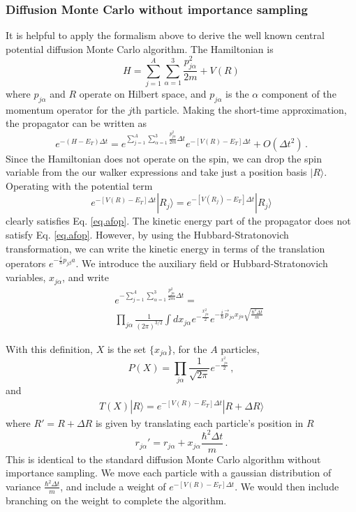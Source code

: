  \subsubsection{Diffusion Monte Carlo without importance sampling}
 It is helpful to apply the formalism above to derive
 the well known central potential
 diffusion Monte Carlo algorithm\cite{Anderson76}.
 The Hamiltonian is
 \begin{equation}
 H = \sum_{j=1}^A \sum_{\alpha=1}^3 \frac{p_{j\alpha}^2}{2m} + V(R)
 \end{equation}
 where $p_{j\alpha}$ and $R$ operate on Hilbert space, and $p_{j\alpha}$
 is the $\alpha$ component of the momentum operator for the $j$th
 particle.
 Making the short-time approximation, the propagator can be written
 as
 \begin{equation}
 e^{-(H-E_T)\Delta t} = e^{\sum_{j=1}^A\sum_{\alpha=1}^3
 	\frac{p_{j\alpha}^2}{2m} \Delta t}
 e^{-[V(R)-E_T]\Delta t} + O(\Delta t^2) \,.
 \end{equation}
 Since the Hamiltonian does not operate on the spin, we can drop the
 spin variable
 from the our walker expressions and take just a position basis $|R\rangle$.
 Operating with the potential term
 \begin{equation}
 e^{-[V(R)-E_T]\Delta t}|R_j\rangle = 
 e^{-[V(R_j)-E_T]\Delta t}|R_j\rangle
 \end{equation}
 clearly satisfies Eq. \ref{eq.afop}. The kinetic energy part of the
 propagator does not satisfy Eq. \ref{eq.afop}. However, by
 using the Hubbard-Stratonovich transformation,
 we can write the kinetic energy in terms of the translation operators
 $e^{-\frac{i}{\hbar} p_{j\beta} a}$.
 We introduce the auxiliary field or Hubbard-Stratonovich variables,
 $x_{j\alpha}$, and write
 \begin{eqnarray}
 &&
 e^{-\sum_{j=1}^A\sum_{\alpha=1}^3 \frac{p_{j\alpha}^2}{2m} \Delta t} = 
 \nonumber\\
 &&
 \prod_{j\alpha} \frac{1}{(2\pi)^{3/2}} \int d x_{j\alpha}
 e^{-\frac{x_{j\alpha}^2}{2}}
 e^{-\frac{i}{\hbar} \vec p_{j\alpha}
 	x_{j\alpha} \sqrt{\frac{\hbar^2 \Delta t}{m}}}
 \end{eqnarray}
 
 With this definition, $X$ is the set $\{x_{j\alpha}\}$,
 for the $A$ particles,
 \begin{equation}
 P(X) =
 \prod_{j\alpha} \frac{1}{\sqrt{2\pi}} e^{-\frac{x_{j\alpha}^2}{2}} \,,
 \end{equation}
 and
 \begin{eqnarray}
 T(X)|R\rangle =
 e^{-[V(R)-E_T]\Delta t} |R+\Delta R\rangle
 \end{eqnarray}
 where $R' = R+\Delta R$ is given by translating each particle's position in $R$
 \begin{equation}
 r_{j\alpha}' = r_{j\alpha} + x_{j\alpha} \frac{\hbar^2 \Delta t}{m} \,.
 \end{equation}
 This is identical to the standard diffusion Monte Carlo algorithm without
 importance sampling. We move
 each particle with a gaussian distribution of variance
 $\frac{\hbar^2 \Delta t}{m}$, and include a weight of
 $e^{-[V(R)-E_T]\Delta t}$. We would then include branching on the weight
 to complete the algorithm.
 
